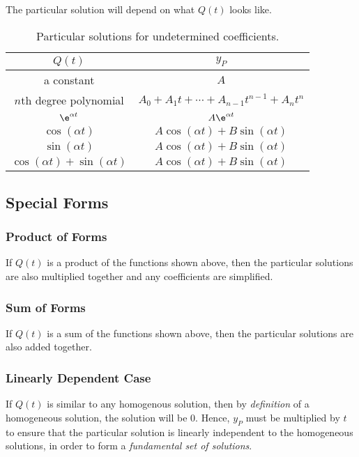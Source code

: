 \documentclass{article}
\begin{document}
The particular solution will depend on what \(Q(t)\) looks like.
\begin{table}[H]
    \centering
    \begin{tabular}{c c}
        \toprule
        \(Q(t)\)                                                          & \(y_P\)                                                             \\
        \midrule
        a constant                                                        & \(A\)                                                               \\
        \(n\)th degree polynomial                                         & \(A_0 + A_1t + \cdots + A_{n-1}t^{n-1} + A_n t^n\)                  \\
        \(\e^{\alpha t}\)                                                 & \(A\e^{\alpha t}\)                                                  \\
        \(\cos{\left( \alpha t \right)}\)                                 & \(A\cos{\left( \alpha t \right)} + B\sin{\left( \alpha t \right)}\) \\
        \(\sin{\left( \alpha t \right)}\)                                 & \(A\cos{\left( \alpha t \right)} + B\sin{\left( \alpha t \right)}\) \\
        \(\cos{\left( \alpha t \right)} + \sin{\left( \alpha t \right)}\) & \(A\cos{\left( \alpha t \right)} + B\sin{\left( \alpha t \right)}\) \\
        \bottomrule
    \end{tabular}
    \caption{Particular solutions for undetermined coefficients.}
\end{table}
\subsection{Special Forms}
\subsubsection{Product of Forms}
If \(Q(t)\) is a product of the functions shown above, then the
particular solutions are also multiplied together and any coefficients are simplified.
\subsubsection{Sum of Forms}
If \(Q(t)\) is a sum of the functions shown above, then the
particular solutions are also added together.
\subsubsection{Linearly Dependent Case}
If \(Q(t)\) is similar to any homogenous solution, then by \textit{definition} of
a homogeneous solution, the solution will be \(0\). Hence, \(y_P\) must be multiplied by \(t\)
to ensure that the particular solution is linearly independent to the homogeneous solutions,
in order to form a \textit{fundamental set of solutions}.
\end{document}
